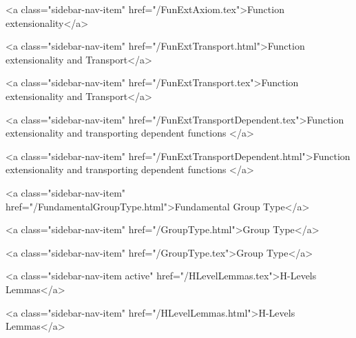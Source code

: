       
    
      
        
          <a class="sidebar-nav-item" href="/FunExtAxiom.tex">Function extensionality</a>
        
      
    
      
        
          <a class="sidebar-nav-item" href="/FunExtTransport.html">Function extensionality and Transport</a>
        
      
    
      
        
          <a class="sidebar-nav-item" href="/FunExtTransport.tex">Function extensionality and Transport</a>
        
      
    
      
        
          <a class="sidebar-nav-item" href="/FunExtTransportDependent.tex">Function extensionality and transporting dependent functions </a>
        
      
    
      
        
          <a class="sidebar-nav-item" href="/FunExtTransportDependent.html">Function extensionality and transporting dependent functions </a>
        
      
    
      
        
          <a class="sidebar-nav-item" href="/FundamentalGroupType.html">Fundamental Group Type</a>
        
      
    
      
        
          <a class="sidebar-nav-item" href="/GroupType.html">Group Type</a>
        
      
    
      
        
          <a class="sidebar-nav-item" href="/GroupType.tex">Group Type</a>
        
      
    
      
        
          <a class="sidebar-nav-item active" href="/HLevelLemmas.tex">H-Levels Lemmas</a>
        
      
    
      
        
          <a class="sidebar-nav-item" href="/HLevelLemmas.html">H-Levels Lemmas</a>
        
      
    
